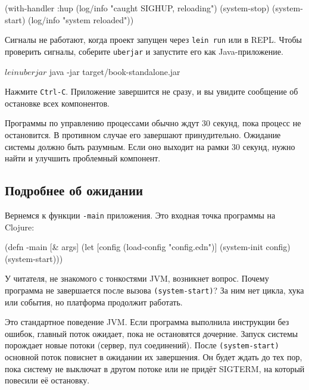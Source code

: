 
\begin{english}
  \begin{clojure}
(with-handler :hup
  (log/info "caught SIGHUP, reloading")
  (system-stop)
  (system-start)
  (log/info "system reloaded"))
  \end{clojure}
\end{english}

Сигналы не работают, когда проект запущен через \verb|lein run| или в
REPL. Чтобы проверить сигналы, соберите \verb|uberjar| и запустите его как
Java-приложение.

\begin{english}
  \begin{bash}
$ lein uberjar
$ java -jar target/book-standalone.jar
  \end{bash}
\end{english}

Нажмите \verb|Ctrl-C|. Приложение завершится не сразу, и вы увидите сообщение
об остановке всех компонентов.

Программы по управлению процессами обычно ждут 30 секунд, пока процесс не
остановится. В противном случае его завершают принудительно. Ожидание системы
должно быть разумным. Если оно выходит на рамки 30 секунд, нужно найти и
улучшить проблемный компонент.

\subsection{Подробнее об ожидании}


Вернемся к функции \verb|-main| приложения. Это входная точка программы на
Clojure:

\begin{english}
  \begin{clojure}
(defn -main [& args]
  (let [config (load-config "config.edn")]
    (system-init config)
    (system-start)))
  \end{clojure}
\end{english}

У читателя, не знакомого с тонкостями JVM, возникнет вопрос. Почему программа не
завершается после вызова \verb|(system-start)|? За ним нет цикла, хука или
события, но платформа продолжит работать.


Это стандартное поведение JVM. Если программа выполнила инструкции без ошибок,
главный поток ожидает, пока не остановятся дочерние. Запуск системы порождает
новые потоки (сервер, пул соединений). После \verb|(system-start)| основной
поток повиснет в ожидании их завершения. Он будет ждать до тех пор, пока систему
не выключат в другом потоке или не придёт SIGTERM, на который повесили её
остановку.

